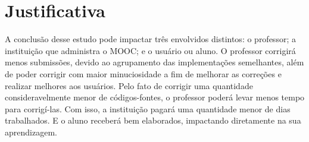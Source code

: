 \chapter{Justificativa}

	A conclusão desse estudo pode impactar três envolvidos distintos: o professor;
	a instituição que administra o \acs{MOOC}; e o usuário ou aluno. O professor
	corrigirá menos submissões, devido ao agrupamento das implementações semelhantes,
	além de poder corrigir com maior minuciosidade a fim de melhorar as correções e
	realizar melhores  aos usuários. Pelo fato de corrigir uma
	quantidade consideravelmente menor de códigos-fontes, o professor poderá levar
	menos tempo para corrigí-las. Com isso, a instituição pagará uma quantidade menor
	de dias trabalhados. E o aluno receberá  bem elaborados,
	impactando diretamente na sua aprendizagem.